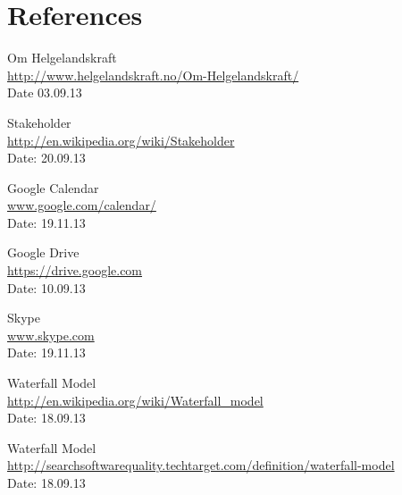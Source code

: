 \chapter{References}

\begingroup
\renewcommand{\chapter}[2]{} %
\begin{thebibliography}{99}



	Om Helgelandskraft \\
	\href{http://www.helgelandskraft.no/Om-Helgelandskraft/}{http://www.helgelandskraft.no/Om-Helgelandskraft/} \\
	Date 03.09.13

	Stakeholder \\
	\href{http://en.wikipedia.org/wiki/Stakeholder}{http://en.wikipedia.org/wiki/Stakeholder} \\
	Date: 20.09.13

	Google Calendar \\
	\href {https://www.google.com/calendar/}{www.google.com/calendar/} \\
	Date: 19.11.13

	Google Drive \\
	\href{https://drive.google.com}{https://drive.google.com} \\
	Date: 10.09.13

	Skype \\
	\href{http://www.skype.com/en/}{www.skype.com} \\
	Date: 19.11.13


	Waterfall Model \\
	\href {http://en.wikipedia.org/wiki/Waterfall_model}{http://en.wikipedia.org/wiki/Waterfall\_model} \\
	Date: 18.09.13

	Waterfall Model \\
	\href {http://searchsoftwarequality.techtarget.com/definition/waterfall-model}{http://searchsoftwarequality.techtarget.com/definition/waterfall-model} \\
	Date: 18.09.13


\end{thebibliography}
